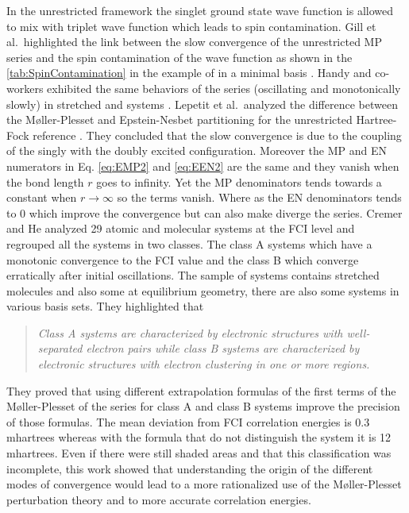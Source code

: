 \documentclass[11pt,a4paper]{article}
\begin{document}
In the unrestricted framework the singlet ground state wave function is allowed to mix with triplet wave function which leads to spin contamination. Gill et al.~highlighted the link between the slow convergence of the unrestricted MP series and the spin contamination of the wave function as shown in the \autoref{tab:SpinContamination} in the example of  in a minimal basis \cite{Gill_1988}. 
Handy and co-workers exhibited the same behaviors of the series (oscillating and monotonically slowly) in stretched  and  systems \cite{Handy_1985}. Lepetit et al.~analyzed the difference between the M{\o}ller-Plesset and Epstein-Nesbet partitioning for the unrestricted Hartree-Fock reference \cite{Lepetit_1988}. They concluded that the slow convergence is due to the coupling of the singly with the doubly excited configuration. Moreover the MP and EN numerators in Eq. \eqref{eq:EMP2} and \eqref{eq:EEN2} are the same and they vanish when the bond length $r$ goes to infinity. Yet the MP denominators tends towards a constant when $r\rightarrow\infty$ so the terms vanish. Where as the EN denominators tends to 0 which improve the convergence but can also make diverge the series.
Cremer and He analyzed 29 atomic and molecular systems at the FCI level \cite{Cremer_1996} and regrouped all the systems in two classes. The class A systems which have a monotonic convergence to the FCI value and the class B which converge erratically after initial oscillations. The sample of systems contains stretched molecules and also some at equilibrium geometry, there are also some systems in various basis sets. They highlighted that \cite{Cremer_1996}\begin{quote}
\textit{Class A systems are characterized by electronic structures with well-separated electron pairs while class B systems are characterized by electronic structures with electron clustering in one or more regions.}
\end{quote}
They proved that using different extrapolation formulas of the first terms of the M{\o}ller-Plesset of the series for class A and class B systems improve the precision of those formulas. The mean deviation from FCI correlation energies is 0.3 mhartrees whereas with the formula that do not distinguish the system it is 12 mhartrees. Even if there were still shaded areas and that this classification was incomplete, this work showed that understanding the origin of the different modes of convergence would lead to a more rationalized use of the M{\o}ller-Plesset perturbation theory and to more accurate correlation energies.
\end{document}
